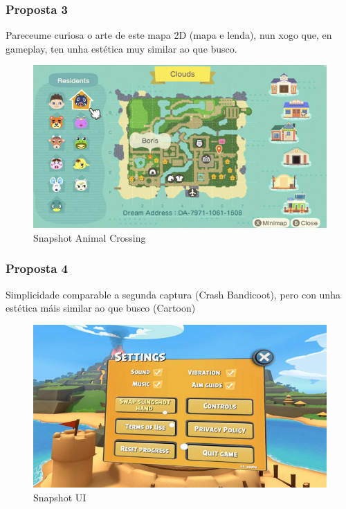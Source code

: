 \documentclass{report}  %
\begin{document}
\subsubsection{Proposta 3}
Pareceume curiosa o arte de este mapa 2D (mapa e lenda), nun xogo que, en 
gameplay, ten unha estética muy similar ao que busco. 

\begin{figure}[h]
    \centering
    \includegraphics[width=1\textwidth]{images/inspiracion3.png}
    \caption{Snapshot Animal Crossing}
    \label{fig:Snapshot Animal Crossing}
\end{figure}
\clearpage
\subsubsection{Proposta 4}
Simplicidade comparable a segunda captura (Crash Bandicoot), pero con unha 
estética máis similar ao que busco (Cartoon)
\begin{figure}[h]
    \centering
    \includegraphics[width=1\textwidth]{images/inspiracion4.png}
    \caption{Snapshot UI}
    \label{fig:Snapshot}
\end{figure}
\end{document}
